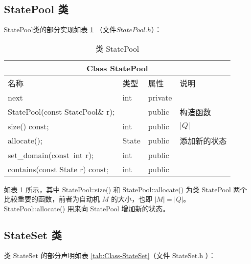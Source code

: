 \subsection{StatePool 类}
StatePool类的部分实现如表 \ref{tab:Class-StatePool} （文件$StatePool.h$）：

\begin{table}[!htbp]
    \caption{类 StatePool}
    \label{tab:Class-StatePool}
    \centering
    \small%
    \setlength{\tabcolsep}{4pt}%
    \renewcommand{\arraystretch}{1.2}%
        \begin{tabular}{llll} %
        \toprule 
         \multicolumn{4}{c}{Class StatePool} \\
        \midrule
        名称& 类型 & 属性  &\mbox{说明} \\
        \midrule
        next & int & private &          \\
        \midrule 
        StatePool(const StatePool\& r);& & public &构造函数 \\
        size() const; & int & public &  $|Q|$ \\
        allocate();  &   State &  public &  添加新的状态 \\
        set\_domain(const\ int r); & int & public & \\
        contains(const State r) const; & int & public & \\
        \bottomrule 
    \end{tabular}
\end{table}
如表 \ref{tab:Class-StatePool} 所示，其中 StatePool::size() 和 StatePool::allocate() 为类 StatePool 两个比较重要的函数，前者为自动机 $M$ 的大小，也即 $|M|=|Q|$。 StatePool::allocate() 用来向 StatePool 增加新的状态。
\subsection{StateSet 类}
类 StateSet 的部分声明如表 \ref{tab:Class-StateSet}（文件 StateSet.h ）：
    
